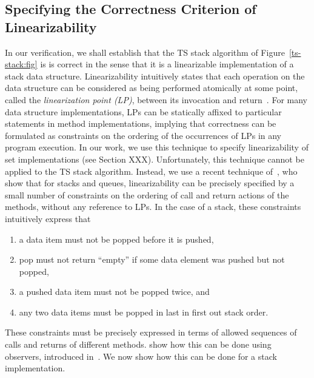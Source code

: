 \subsection{Specifying the Correctness Criterion of Linearizability}
In our verification, we shall establish that the TS stack algorithm of
Figure~\ref{ts-stack:fig} is is correct in the sense that it is a
linearizable implementation of a stack data structure.
Linearizability intuitively states that
each operation on the data structure can be considered as being
performed atomically at some point, called the {\em linearization point (LP)},
between its invocation and return~\cite{HeWi:linearizability}.
For many data structure implementations, LPs can be statically
affixed to particular statements in method implementations,
implying that correctness can be formulated as constraints on the ordering of the
occurrences of LPs in any program execution.
In our work, we use this technique to specify linearizability of
set implementations (see Section XXX).
Unfortunately, this technique cannot be applied to the TS stack algorithm.
Instead, we use a recent technique of~\cite{BEEH:icalp15}, who show
that for stacks and queues,
linearizability can be precisely specified by a small number of
constraints on the ordering of call and return actions of the methods,
without any reference to LPs.
In the case of a stack, these constraints intuitively express that
\begin{enumerate}
\item a data item must not be popped before it is pushed,
\item pop must not return ``empty'' if some data element was pushed but not
  popped,
\item a pushed data item must not be popped twice, and
\item any two data items must be popped in last in first out stack order.%
\end{enumerate}
These constraints must be precisely expressed in terms of allowed
sequences of calls
and returns of different methods. \cite{BEEH:icalp15} show how this can be
done using observers, introduced in~\cite{AHHR:integrated}. 
We now show how this can be done for a stack implementation.

